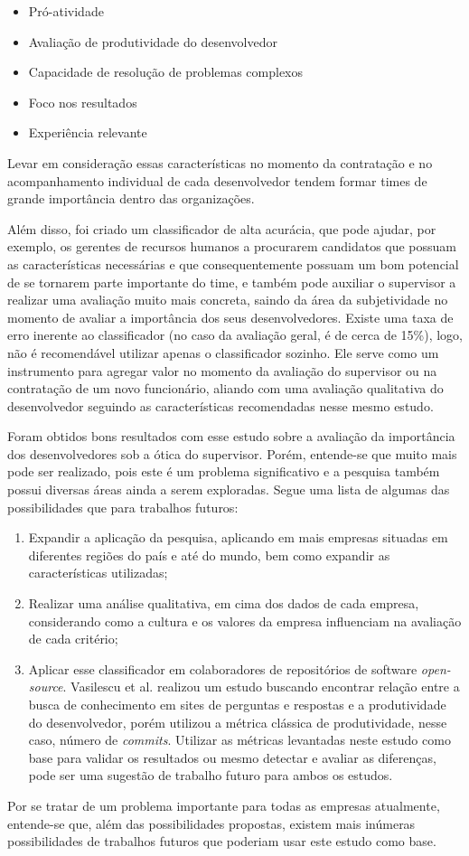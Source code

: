 \begin{itemize}
	\item Pró-atividade
	\item Avaliação de produtividade do desenvolvedor
	\item Capacidade de resolução de problemas complexos
	\item Foco nos resultados
	\item Experiência relevante
\end{itemize}

Levar em consideração essas características no momento da contratação e no acompanhamento individual de cada desenvolvedor tendem formar times de grande importância dentro das organizações.

Além disso, foi criado um classificador de alta acurácia, que pode ajudar, por exemplo, os gerentes de recursos humanos a procurarem candidatos que possuam as características necessárias e que consequentemente possuam um bom potencial de se tornarem parte importante do time, e também pode auxiliar o supervisor a realizar uma avaliação muito mais concreta, saindo da área da subjetividade no momento de avaliar a importância dos seus desenvolvedores. Existe uma taxa de erro inerente ao classificador (no caso da avaliação geral, é de cerca de 15\%), logo, não é recomendável utilizar apenas o classificador sozinho. Ele serve como um instrumento para agregar valor no momento da avaliação do supervisor ou na contratação de um novo funcionário, aliando com uma avaliação qualitativa do desenvolvedor seguindo as características recomendadas nesse mesmo estudo.

Foram obtidos bons resultados com esse estudo sobre a avaliação da importância dos desenvolvedores sob a ótica do supervisor. Porém, entende-se que muito mais pode ser realizado, pois este é um problema significativo e a pesquisa também possui diversas áreas ainda a serem exploradas. Segue uma lista de algumas das possibilidades que para trabalhos futuros:
\begin{enumerate}
	\item Expandir a aplicação da pesquisa, aplicando em mais empresas situadas em diferentes regiões do país e até do mundo, bem como expandir as características utilizadas;
	\item Realizar uma análise qualitativa, em cima dos dados de cada empresa, considerando como a cultura e os valores da empresa influenciam na avaliação de cada critério;
	\item Aplicar esse classificador em colaboradores de repositórios de software \textit{open-source}. Vasilescu et al. \cite{Vasilescu2013} realizou um estudo buscando encontrar relação entre a busca de conhecimento em sites de perguntas e respostas e a produtividade do desenvolvedor, porém utilizou a métrica clássica de produtividade, nesse caso, número de \textit{commits}. Utilizar as métricas levantadas neste estudo como base para validar os resultados ou mesmo detectar e avaliar as diferenças, pode ser uma sugestão de trabalho futuro para ambos os estudos.
\end{enumerate}

Por se tratar de um problema importante para todas as empresas atualmente, entende-se que, além das possibilidades propostas, existem mais inúmeras possibilidades de trabalhos futuros que poderiam usar este estudo como base.
